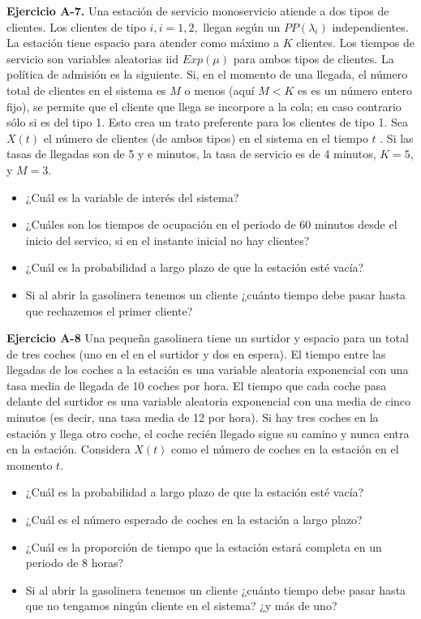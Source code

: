 \documentclass[
]{book}
\providecommand{\tightlist}{%
  \setlength{\itemsep}{0pt}\setlength{\parskip}{0pt}}
\theoremstyle{definition}
\theoremstyle{definition}
\theoremstyle{definition}
\theoremstyle{definition}
\theoremstyle{remark}
\begin{document}
\textbf{Ejercicio A-7.} Una estación de servicio monoservicio atiende a dos tipos de clientes. Los clientes de tipo \(i, i = 1, 2,\) llegan según un \(PP(\lambda_i)\) independientes. La estación tiene espacio para atender como máximo a \(K\) clientes. Los tiempos de servicio son variables aleatorias iid \(Exp(\mu)\) para ambos tipos de clientes. La política de admisión es la siguiente. Si, en el momento de una llegada, el número total de clientes en el sistema es \(M\) o menos (aquí \(M < K\) es es un número entero fijo), se permite que el cliente que llega se incorpore a la cola; en caso contrario sólo si es del tipo 1. Esto crea un trato preferente para los clientes de tipo 1. Sea \(X(t)\) el número de clientes (de ambos tipos) en el sistema en el tiempo \(t\) . Si las tasas de llegadas son de 5 y e minutos, la tasa de servicio es de 4 minutos, \(K = 5\), y \(M = 3\).

\begin{itemize}
\tightlist
\item
  ¿Cuál es la variable de interés del sistema?
\item
  ¿Cuáles son los tiempos de ocupación en el periodo de 60 minutos desde el inicio del servico, si en el instante inicial no hay clientes?
\item
  ¿Cuál es la probabilidad a largo plazo de que la estación esté vacía?
\item
  Si al abrir la gasolinera tenemos un cliente ¿cuánto tiempo debe pasar hasta que rechazemos el primer cliente?
\end{itemize}

\textbf{Ejercicio A-8} Una pequeña gasolinera tiene un surtidor y espacio para un total de tres coches (uno en el en el surtidor y dos en espera). El tiempo entre las llegadas de los coches a la estación es una variable aleatoria exponencial con una tasa media de llegada de 10 coches por hora. El tiempo que cada coche pasa delante del surtidor es una variable aleatoria exponencial con una media de cinco minutos (es decir, una tasa media de 12 por hora). Si hay tres coches en la estación y llega otro coche, el coche recién llegado sigue su camino y nunca entra en la estación. Considera \(X(t)\) como el número de coches en la estación en el momento \(t\).

\begin{itemize}
\tightlist
\item
  ¿Cuál es la probabilidad a largo plazo de que la estación esté vacía?
\item
  ¿Cuál es el número esperado de coches en la estación a largo plazo?
\item
  ¿Cuál es la proporción de tiempo que la estación estará completa en un periodo de 8 horas?
\item
  Si al abrir la gasolinera tenemos un cliente ¿cuánto tiempo debe pasar hasta que no tengamos ningún cliente en el sistema? ¿y más de uno?
\end{itemize}
\end{document}
